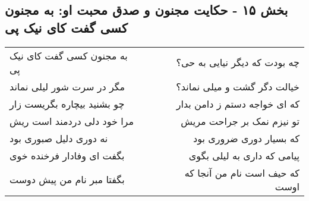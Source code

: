 \begin{center}
\section*{بخش ۱۵ - حکایت مجنون و صدق محبت او: به مجنون کسی گفت کای نیک پی}
\label{sec:015}
\begin{longtable}{l p{0.5cm} r}
به مجنون کسی گفت کای نیک پی
&&
چه بودت که دیگر نیایی به حی؟
\\
مگر در سرت شور لیلی نماند
&&
خیالت دگر گشت و میلی نماند؟
\\
چو بشنید بیچاره بگریست زار
&&
که ای خواجه دستم ز دامن بدار
\\
مرا خود دلی دردمند است ریش
&&
تو نیزم نمک بر جراحت مریش
\\
نه دوری دلیل صبوری بود
&&
که بسیار دوری ضروری بود
\\
بگفت ای وفادار فرخنده خوی
&&
پیامی که داری به لیلی بگوی
\\
بگفتا مبر نام من پیش دوست
&&
که حیف است نام من آنجا که اوست
\\
\end{longtable}
\end{center}
